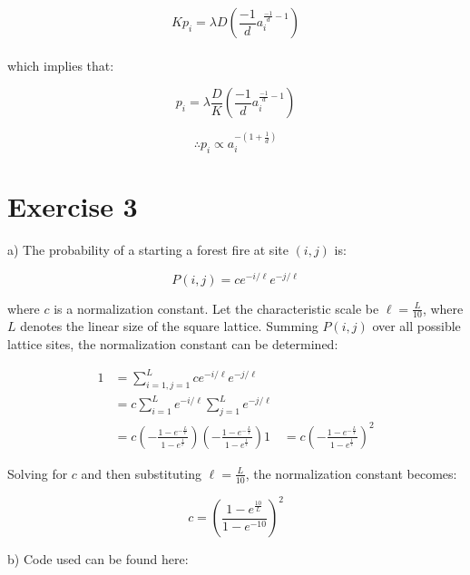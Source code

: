 \documentclass{article}
\begin{document}
\begin{equation}
K p_i = \lambda D (\frac{-1}{d} a_i^{\frac{-1}{d}-1})
\end{equation} \\

which implies that:

\begin{equation}
p_i = \lambda \frac{D}{K}  (\frac{-1}{d} a_i^{\frac{-1}{d}-1})
\end{equation}

\begin{equation}
\therefore p_i \propto a_i^{-(1+\frac{1}{d})}
\end{equation}

\section{Exercise 3}

a) The probability of a starting a forest fire at site $(i,j)$ is:

\begin{equation}
P(i,j) = c e^{-i/\ell}e^{-j/\ell}
\end{equation}

where $c$ is a normalization constant. Let the characteristic scale be $\ell = \frac{L}{10}$, where $L$ denotes the linear size of the square lattice. Summing $P(i,j)$ over all possible lattice sites, the normalization constant can be determined:

\begin{align}
1 &= \sum_{i=1,j=1}^{L} c e^{-i/\ell}e^{-j/\ell} \\
&= c \sum_{i=1}^{L} e^{-i/\ell} \sum_{j=1}^{L} e^{-j/\ell} \\
&= c (-\frac{1-e^{-\frac{L}{\ell}}}{1-e^{\frac{1}{\ell}}}) (-\frac{1-e^{-\frac{L}{\ell}}}{1-e^{\frac{1}{\ell}}})
1 &= c (-\frac{1-e^{-\frac{L}{\ell}}}{1-e^{\frac{1}{\ell}}})^2
\end{align}

Solving for $c$ and then substituting $\ell = \frac{L}{10}$, the normalization constant becomes:

\begin{equation}
c = (\frac{1-e^{\frac{10}{L}}}{1-e^{-10}})^2
\end{equation}

b) Code used can be found here: 
\end{document}
